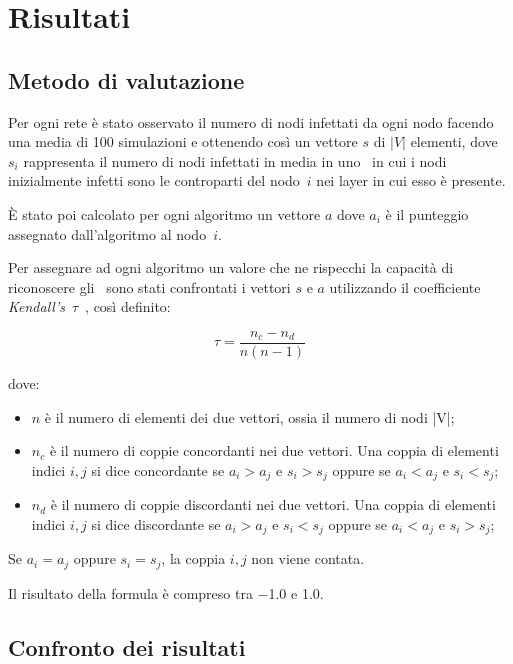 \chapter{Risultati}

\section{Metodo di valutazione}

Per ogni rete è stato osservato il numero di nodi infettati da ogni nodo facendo una media di \num{100} simulazioni e 
ottenendo così un vettore $s$ di $|V|$ elementi, dove $s_i$ rappresenta il numero di nodi 
infettati in media in uno \spproc\ in cui i nodi inizialmente infetti sono le controparti del 
nodo~$i$ nei layer in cui esso è presente.

È stato poi calcolato per ogni algoritmo un vettore $a$ dove $a_i$ 
è il punteggio assegnato dall'algoritmo al nodo~$i$.

Per assegnare ad ogni algoritmo un valore che ne rispecchi la capacità di riconoscere 
gli \infsp\ sono stati confrontati i vettori $s$ e $a$ utilizzando il coefficiente 
\textit{Kendall's}~$\tau$~\cite{kendall:tau}, 
così definito:

\begin{equation}
    \tau = \frac{n_c - n_d}{n(n-1)}
\end{equation}

dove:
\begin{itemize}
    \item $n$ è il numero di elementi dei due vettori, ossia il numero di nodi |V|;
    \item $n_c$ è il numero di coppie concordanti nei due vettori. Una coppia di elementi 
            indici $i, j$ si dice concordante se $a_i > a_j$ e $s_i > s_j$ oppure se $a_i < a_j$ e $s_i < s_j$;
    \item $n_d$ è il numero di coppie discordanti nei due vettori. Una coppia di elementi 
    indici $i, j$ si dice discordante se $a_i > a_j$ e $s_i < s_j$ oppure se $a_i < a_j$ e $s_i > s_j$;    
\end{itemize}

Se $a_i = a_j$ oppure $s_i = s_j$, la coppia $i, j$ non viene contata.

Il risultato della formula è compreso tra \num{-1.0} e {1.0}.

\section{Confronto dei risultati}

